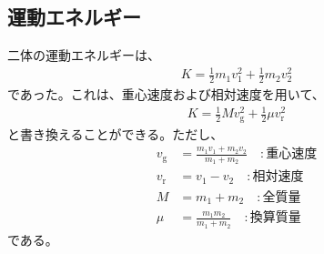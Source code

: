 \documentclass[a4paper,11pt]{jsarticle}
\numberwithin{equation}{section}
\begin{document}
\subsection{運動エネルギー}
二体の運動エネルギーは、
\begin{align}
    K = \frac{1}{2}m_1v_1^2 + \frac{1}{2}m_2v_2^2
\end{align}
であった。これは、重心速度および相対速度を用いて、
\begin{align}
    K = \frac{1}{2}Mv_{\text{g}}^2 + \frac{1}{2}\mu v_{\text{r}}^2
\end{align}
と書き換えることができる。ただし、
\begin{align}
    v_{\text{g}} &= \frac{m_1v_1 + m_2v_2}{m_1 + m_2}\quad : \text{重心速度} \\
    v_{\text{r}} &= v_1 - v_2\quad : \text{相対速度} \\
    M &= m_1 + m_2 \quad: \text{全質量} \\
    \mu &= \frac{m_1m_2}{m_1 + m_2} \quad: \text{換算質量}
\end{align}
である。
\end{document}
